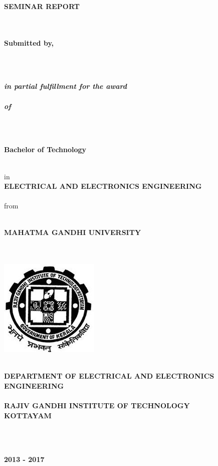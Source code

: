 \documentclass[12pt,a4paper]{reportmod}
\begin{document}
\thispagestyle{empty}%
\thispagestyle{empty}%
\begin{center}
\begin{LARGE}
\textbf{\topic}
\end{LARGE}\\~\\~\\
\begin{large}
\textbf{SEMINAR REPORT}
\end{large}\\~\\
\textbf{Submitted by,}\\
\begin{large}
\textbf{\name}
\end{large}\\~\\
\begin{large}
\textit{\textbf{in partial fulfillment for the award}}\\~\\
\textit{\textbf{of}}
\end{large}\\~\\
\begin{large}
\textbf{Bachelor of Technology}
\end{large}\\
in\\
\textbf{ELECTRICAL AND ELECTRONICS ENGINEERING}\\~\\
from\\~\\
\begin{Large}
\textbf{MAHATMA GANDHI UNIVERSITY}
\end{Large}\\~\\
\includegraphics[height=1.6 in]{logo.png}\\~\\
\begin{large}
\textbf{DEPARTMENT OF ELECTRICAL AND ELECTRONICS ENGINEERING}\\~\\
\textbf{RAJIV GANDHI INSTITUTE OF TECHNOLOGY\\KOTTAYAM}
\end{large}\\~\\
\begin{large}
\textbf{2013 - 2017}
\end{large}\\
\end{center}
\end{document}
